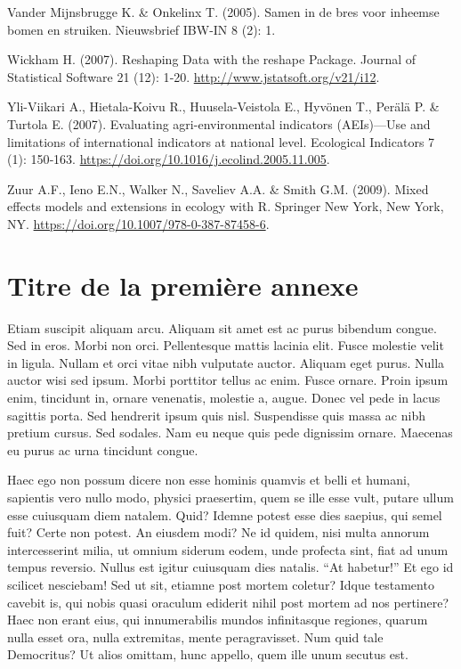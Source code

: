 \documentclass[twoside]{extreport}
\begin{document}
\begin{CSLReferences}{1}{0}
\leavevmode{}%
Vander Mijnsbrugge K. \& Onkelinx T. (2005). {Samen in de bres voor
inheemse bomen en struiken}. Nieuwsbrief IBW-IN 8 (2): 1.

\leavevmode{}%
Wickham H. (2007). {Reshaping Data with the reshape Package}. Journal of
Statistical Software 21 (12): 1‑20.
\url{http://www.jstatsoft.org/v21/i12}.

\leavevmode{}%
Yli-Viikari A., Hietala-Koivu R., Huusela-Veistola E., Hyvönen T.,
Perälä P. \& Turtola E. (2007). {Evaluating agri-environmental
indicators (AEIs)---Use and limitations of international indicators at
national level}. Ecological Indicators 7 (1): 150‑163.
\url{https://doi.org/10.1016/j.ecolind.2005.11.005}.

\leavevmode{}%
Zuur A.F., Ieno E.N., Walker N., Saveliev A.A. \& Smith G.M. (2009).
{Mixed effects models and extensions in ecology with R}. Springer New
York, New York, NY. \url{https://doi.org/10.1007/978-0-387-87458-6}.

\end{CSLReferences}

\appendix

\hypertarget{titre-de-la-premiuxe8re-annexe}{%
\chapter{Titre de la première
annexe}\label{titre-de-la-premiuxe8re-annexe}}

Etiam suscipit aliquam arcu. Aliquam sit amet est ac purus bibendum
congue. Sed in eros. Morbi non orci. Pellentesque mattis lacinia elit.
Fusce molestie velit in ligula. Nullam et orci vitae nibh vulputate
auctor. Aliquam eget purus. Nulla auctor wisi sed ipsum. Morbi porttitor
tellus ac enim. Fusce ornare. Proin ipsum enim, tincidunt in, ornare
venenatis, molestie a, augue. Donec vel pede in lacus sagittis porta.
Sed hendrerit ipsum quis nisl. Suspendisse quis massa ac nibh pretium
cursus. Sed sodales. Nam eu neque quis pede dignissim ornare. Maecenas
eu purus ac urna tincidunt congue.

Haec ego non possum dicere non esse hominis quamvis et belli et humani,
sapientis vero nullo modo, physici praesertim, quem se ille esse vult,
putare ullum esse cuiusquam diem natalem. Quid? Idemne potest esse dies
saepius, qui semel fuit? Certe non potest. An eiusdem modi? Ne id
quidem, nisi multa annorum intercesserint milia, ut omnium siderum
eodem, unde profecta sint, fiat ad unum tempus reversio. Nullus est
igitur cuiusquam dies natalis. ``At habetur!'' Et ego id scilicet
nesciebam! Sed ut sit, etiamne post mortem coletur? Idque testamento
cavebit is, qui nobis quasi oraculum ediderit nihil post mortem ad nos
pertinere? Haec non erant eius, qui innumerabilis mundos infinitasque
regiones, quarum nulla esset ora, nulla extremitas, mente peragravisset.
Num quid tale Democritus? Ut alios omittam, hunc appello, quem ille unum
secutus est.
\end{document}
